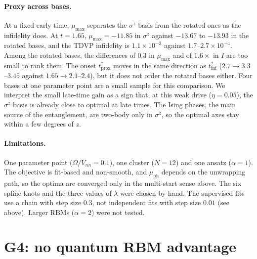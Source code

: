 \documentclass[11pt,a4paper]{article}
\newcommand{\inff}{I}
\newcommand{\tinf}{t^*_{\mathrm{inf}}}
\newcommand{\tprox}{t^*_{\mathrm{prox}}}
\begin{document}
\paragraph{Proxy across bases.} At a fixed early time, $\mu_{\max}$ separates the $\sigma^z$ basis from the rotated
ones as the infidelity does. At $t=1.65$, $\mu_{\max}=-11.85$ in $\sigma^z$ against $-13.67$ to $-13.93$ in the rotated
bases, and the TDVP infidelity is $1.1\times10^{-3}$ against $1.7$--$2.7\times10^{-4}$. Among the rotated bases, the
differences of $0.3$ in $\mu_{\max}$ and of $1.6\times$ in $\inff$ are too small to rank them. The onset $\tprox$ moves
in the same direction as $\tinf$ ($2.7\to3.3$--$3.45$ against $1.65\to2.1$--$2.4$), but it does not order the rotated
bases either. Four bases at one parameter point are a small sample for this comparison. We interpret the small
late-time gain as a sign that, at this weak drive ($\eta=0.05$), the $\sigma^z$ basis is already close to optimal at
late times. The Ising phases, the main source of the entanglement, are two-body only in $\sigma^z$, so the optimal axes
stay within a few degrees of $z$.

\paragraph{Limitations.} One parameter point ($\Omega/V_{nn}=0.1$), one cluster ($N=12$) and one ansatz ($\alpha=1$).
The objective is fit-based and non-smooth, and $\mu_{\mathrm{ph}}$ depends on the unwrapping path, so the optima are
converged only in the multi-start sense above. The six spline knots and the three values of $\lambda$ were chosen by
hand. The supervised fits use a chain with step size $0.3$, not independent fits with step size $0.01$ (see above).
Larger RBMs ($\alpha=2$) were not tested.

\section{G4: no quantum RBM advantage}
\label{sec:g4}
\end{document}
